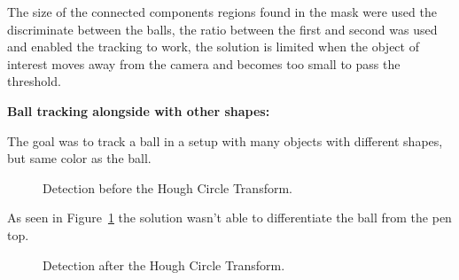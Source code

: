 \documentclass[10pt,twocolumn,letterpaper]{article}
\begin{document}
  The size of the connected components regions found in the mask were used the
  discriminate between the balls, the ratio between the first and second was
  used and enabled the tracking to work, the solution is limited when the object
  of interest moves away from the camera and becomes too small to pass the
  threshold.

  \bigbreak{}
  \textbf{Ball tracking alongside with other shapes:}
  \bigbreak{}

  The goal was to track a ball in a setup with many objects with different
  shapes, but same color as the ball.

  \begin{figure}[!h]
    \centering
    \setlength{\fboxsep}{1pt}
    \setlength{\fboxrule}{1pt}
    \caption{Detection before the Hough Circle Transform.}\label{fig:not_hough}
  \end{figure}

  As seen in Figure~\ref{fig:not_hough} the solution wasn't able to
  differentiate the ball from the pen top.

  \begin{figure}[!h]
    \centering
    \setlength{\fboxsep}{1pt}
    \setlength{\fboxrule}{1pt}
    \caption{Detection after the Hough Circle Transform.}\label{fig:yes_hough}
  \end{figure}
\end{document}
